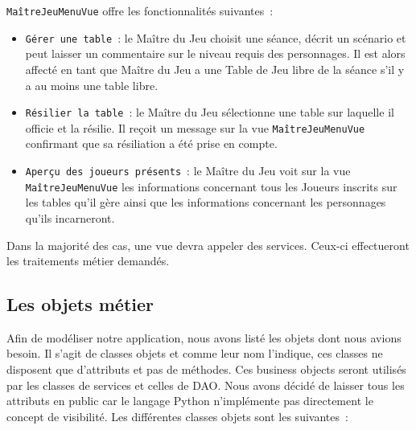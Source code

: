 \documentclass[11pt]{article}
\begin{document}
\texttt{MaîtreJeuMenuVue} offre les fonctionnalités suivantes~:
\begin{itemize}[label=, font=\small]
    \item\texttt{Gérer une table}~: le Maître du Jeu choisit une séance, décrit un scénario et peut laisser un commentaire sur le niveau requis des personnages. Il est alors affecté en tant que Maître du Jeu a une Table de Jeu libre de la séance s'il y a au moins une table libre.
    \item\texttt{Résilier la table}~: le Maître du Jeu sélectionne une table sur laquelle il officie et la résilie. Il reçoit un message sur la vue \texttt{MaîtreJeuMenuVue} confirmant que sa résiliation a été prise en compte.
    \item\texttt{Aperçu des joueurs présents}~: le Maître du Jeu voit sur la vue \texttt{MaîtreJeuMenuVue} les informations concernant tous les Joueurs inscrits sur les tables qu'il gère ainsi que les informations concernant les personnages qu'ils incarneront.
\end{itemize}


\bigbreak
Dans la majorité des cas, une vue devra appeler des services. Ceux-ci effectueront les traitements métier demandés.


\subsection{Les objets métier}

Afin de modéliser notre application, nous avons listé les objets dont nous avions besoin. Il s’agit de classes objets et comme leur nom l’indique, ces classes ne disposent que d’attributs et pas de méthodes. Ces business objects seront utilisés par les classes de services et celles de DAO. Nous avons décidé de laisser tous les attributs en public car le langage Python n'implémente pas directement le concept de visibilité. Les différentes classes objets sont les suivantes~:

\bigbreak
\end{document}
